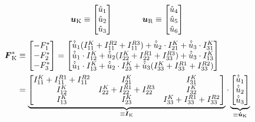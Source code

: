 \begin{equation}
\boldsymbol{u}_{\text{K}} \equiv \begin{bmatrix} \hat{u}_{\text{1}} \\ \hat{u}_{\text{2}} \\ \hat{u}_{\text{3}} \end{bmatrix}
\hspace{35pt}
\boldsymbol{u}_{\text{R}} \equiv \begin{bmatrix} \hat{u}_{\text{4}} \\ \hat{u}_{\text{5}} \\ \hat{u}_{\text{6}} \end{bmatrix}
\end{equation}
\begin{equation}
\begin{split}
\boldsymbol{F}^*_{\text{K}} &\equiv \begin{bmatrix}-F^*_{\text{1}} \\ -F^*_{\text{2}} \\ -F^*_{\text{3}}\end{bmatrix} = 
\begin{bmatrix}
\hat{\dot{u}}_{\text{1}}(I^K_{\text{11}}+I^{R2}_{\text{11}}+I^{R3}_{\text{11}}) + \hat{\dot{u}}_{\text{2}}\cdot I^{K}_{\text{21}} + \hat{\dot{u}}_{\text{3}}\cdot I^{K}_{\text{31}}
\\
\hat{\dot{u}}_{\text{1}}\cdot I^{K}_{\text{12}} + \hat{\dot{u}}_{\text{2}}(I^{K}_{\text{22}}+I^{R1}_{\text{22}}+I^{R3}_{\text{33}}) + \hat{\dot{u}}_{\text{3}}\cdot I^{K}_{\text{13}} 
\\
\hat{\dot{u}}_{\text{1}}\cdot I^{K}_{\text{13}} + \hat{\dot{u}}_{\text{2}}\cdot I^{K}_{\text{23}} + \hat{\dot{u}}_{\text{3}}(I^{K}_{\text{33}}+I^{R1}_{\text{33}}+I^{R2}_{\text{33}})
\end{bmatrix} \\
&= 
\underbrace{
\begin{bmatrix}
I^K_{\text{11}}+I^{R1}_{\text{11}}+I^{R2}_{\text{11}} & I^K_{\text{21}} & I^K_{\text{31}} \\
I^K_{\text{12}} & I^K_{\text{22}}+I^{R1}_{\text{22}}+I^{R3}_{\text{22}} & I^K_{\text{32}} \\
I^K_{\text{13}} & I^K_{\text{23}} & I^K_{\text{33}}+I^{R1}_{\text{33}}+I^{R2}_{\text{33}}
\end{bmatrix}}_{\equiv \boldsymbol{I}_{\text{K}}} \cdot \underbrace{\begin{bmatrix}
\hat{\dot{u}}_{\text{1}} \\ \hat{\dot{u}}_{\text{2}} \\ \hat{\dot{u}}_{\text{3}}
\end{bmatrix}}_{\equiv \boldsymbol{\dot{u}}_{\text{K}}}
\end{split}
\end{equation} 
